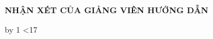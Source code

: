 \vspace*{0.5cm}

\begin{center}
    {\Large \bfseries NHẬN XÉT CỦA GIẢNG VIÊN HƯỚNG DẪN}
\end{center}

\vspace{1.2cm}

\newcount\linecount
{}
\loop
  \noindent\dotfill\par\vspace{0.75cm}
  \advance\linecount by 1
\ifnum\linecount<17
\repeat
